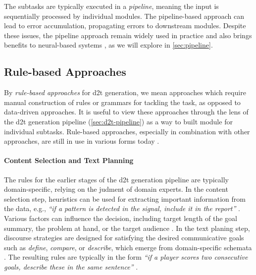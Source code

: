 The subtasks are typically executed in a \emph{pipeline}, meaning the input is sequentially processed by individual modules. The pipeline-based approach can lead to error accumulation, propagating errors to downstream modules. Despite these issues, the pipeline approach remain widely used in practice
and also brings benefits to neural-based systems \cite{ferreiraNeuralDatatotextGeneration2019}, as we will explore in \autoref{sec:pipeline}.


\subsection{Rule-based Approaches}
\label{sec:rule-d2t}

By \emph{rule-based approaches} for \ac{d2t} generation, we mean approaches which require manual construction of rules or grammars for tackling the task, as opposed to data-driven approaches. It is useful to view these approaches through the lens of the \ac{d2t} generation pipeline (\autoref{sec:d2t-pipeline}) as a way to built module for individual subtasks. Rule-based approaches, especially in combination with other approaches, are still in use in various forms today \cite{gattSurveyStateArt2018,daleNaturalLanguageGeneration2020,daleNavigatingTextGeneration2023}.


\paragraph{Content Selection and Text Planning} The rules for the earlier stages of the \ac{d2t} generation pipeline are typically domain-specific, relying on the judment of domain experts. In the content selection step, heuristics can be used for extracting important information from the data, e.g., \textit{``if a pattern is detected in the signal, include it in the report''} \cite{portet2009automatic}. Various factors can influence the decision, including target length of the goal summary, the problem at hand, or the target audience \cite{gkatziaContentSelectionDatatoText2016}. In the text planing step, discourse strategies are designed for satisfying the desired communicative goals such as \emph{define}, \emph{compare}, or \emph{describe}, which emerge from domain-specific schemata \cite{mckeown1985text}. The resulting rules are typically in the form \textit{``if a player scores two consecutive goals, describe these in the same sentence''}  \cite{gattSurveyStateArt2018}.


